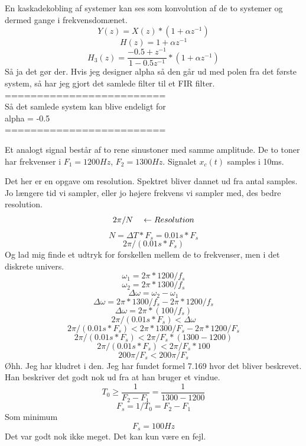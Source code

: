 \begin{EksamensOpgaver}
\begin{Eksamenssæt}[2024 Ordinær]
\begin{eksamensOpgave}
            \begin{UnderOpgave}
                En kaskadekobling af systemer kan ses som konvolution af de to systemer og dermed gange i frekvensdomænet. 
                \[Y(z) = X(z) * (1 + \alpha z^{-1})\]
                \[H(z) = 1 + \alpha z^{-1}\]
                \[H_3(z) = \frac{-0.5 + z^{-1}}{1 - 0.5z^{-1}} * (1 + \alpha z^{-1})\]
                Så ja det gør der. Hvis jeg designer alpha så den går ud med polen fra det første system, så har jeg gjort det samlede filter til et FIR filter.\\
                =========================\\
                Så det samlede system kan blive endeligt for \\
                alpha = -0.5 \\
                =========================\\
            \end{UnderOpgave} 
        \end{eksamensOpgave}
        \begin{eksamensOpgave}
            Et analogt signal består af to rene sinustoner med samme amplitude. De to toner har frekvenser i $F_1 = 1200Hz$, $F_2 = 1300Hz$. Signalet $x_c(t)$ samples i 10ms.
            \begin{UnderOpgave}
                Det her er en opgave om resolution.
                Spektret bliver dannet ud fra antal samples. Jo længere tid vi sampler, eller jo højere frekvens vi sampler med, des bedre resolution. 
                \[2\pi/N \tab{0} \leftarrow Resolution\] 
                \[N = \Delta T * F_s = 0.01s * F_s\]
                \[2\pi/(0.01s * F_s)\] 
                Og lad mig finde et udtryk for forskellen mellem de to frekvenser, men i det diskrete univers. 
                \[\omega_1 = 2\pi * 1200/f_s\]
                \[\omega_2 = 2\pi * 1300/f_s\]
                \[\Delta\omega = \omega_2 - \omega_1\]
                \[\Delta\omega = 2\pi * 1300/f_s - 2\pi * 1200/f_s\] 
                \[\Delta\omega = 2\pi * (100/f_s)\]
                \[2\pi/(0.01s * F_s) < \Delta\omega \] 
                \[2\pi/(0.01s * F_s) < 2\pi * 1300/F_s - 2\pi * 1200/F_s\] 
                \[2\pi/(0.01s * F_s) < 2\pi/F_s * (1300 - 1200)\] 
                \[2\pi/(0.01s * F_s) < 2\pi/F_s * 100\] 
                \[200\pi/F_s < 200\pi/F_s\] 
                Øhh. 
                Jeg har kludret i den. 
                Jeg har fundet formel 7.169 hvor det bliver beskrevet. 
                Han beskriver det godt nok ud fra at han bruger et vindue. 
                \[T_0 \geq \frac{1}{F_2 - F_1} = \frac{1}{1300 - 1200}\]
                \[F_s = 1/T_0 = F_2 - F_1\]
                Som minimum
                \[F_s = 100Hz\] 
                Det var godt nok ikke meget. Det kan kun være en fejl. 
                

\end{UnderOpgave}
\end{eksamensOpgave}
\end{Eksamenssæt}
\end{EksamensOpgaver}
